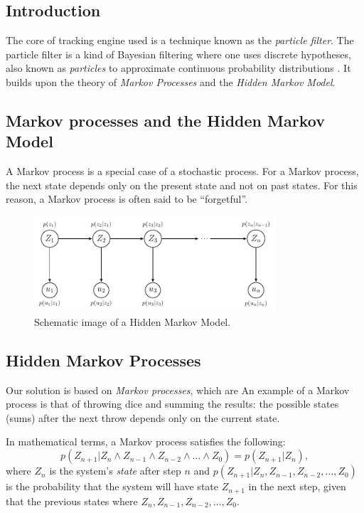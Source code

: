 \subsection{Introduction}
The core of tracking engine used is a technique known as the \emph{particle filter}. The particle filter is a kind of Bayesian filtering where one uses discrete hypotheses, also known as \emph{particles} to approximate continuous probability distributions \cite{ProbRob}. It builds upon the theory of \emph{Markov Processes} and the \emph{Hidden Markov Model}.

\subsection{Markov processes and the Hidden Markov Model}
A Markov process is a special case of a stochastic process. For a Markov process, the next state depends only on the present state and not on past states. For this reason, a Markov process is often said to be ``forgetful''.

\begin{figure}
  \centering
  \includegraphics[width=0.8\textwidth]{hmm-graph.pdf}
  \caption{Schematic image of a Hidden Markov Model.}
  \label{fig:hmm-graph}
\end{figure}

\subsection{Hidden Markov Processes}

Our solution is based on \emph{Markov processes}, which are 
An example of a Markov process is that of throwing dice and summing the results: the possible states (sums) after the next throw depends only on the current state.

In mathematical terms, a Markov process satisfies the following:
\begin{equation}
 p\left(Z_{n+1}|Z_n \wedge Z_{n-1} \wedge Z_{n-2} \wedge \dots \wedge Z_0\right) = p\left(Z_{n+1}|Z_n\right),
\end{equation}
where $Z_n$ is the system's \emph{state} after step $n$ and $p\left(Z_{n+1}|Z_n, Z_{n-1}, Z_{n-2}, \dots, Z_0\right)$ is the probability that the system will have state $Z_{n+1}$ in the next step, given that the previous states where $Z_n, Z_{n-1}, Z_{n-2}, \dots, Z_0$.

